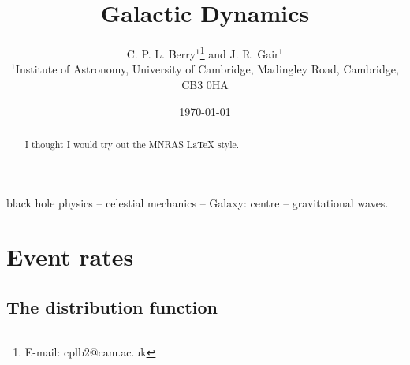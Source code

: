 \documentclass[useAMS,usedcolumn,usegraphicx,usenatbib]{mn2e}
\title[Galactic Dynamics]{Galactic Dynamics}
\author[C. P. L. Berry and J. R. Gair]{C. P. L. Berry$^{1}$\thanks{E-mail:
cplb2@cam.ac.uk}  and J. R. Gair$^{1}$\\
$^{1}$Institute of Astronomy, University of Cambridge, Madingley Road, Cambridge, CB3 0HA}
\begin{document}
\date{\today}

\pagerange{\pageref{firstpage}--\pageref{lastpage}} 

\maketitle

\label{firstpage}

\begin{abstract}
I thought I would try out the MNRAS \LaTeX{} style.
\end{abstract}

\begin{keywords}
black hole physics -- celestial mechanics --  Galaxy: centre -- gravitational waves.
\end{keywords}

\section{Event rates}

\subsection{The distribution function}
\end{document}
